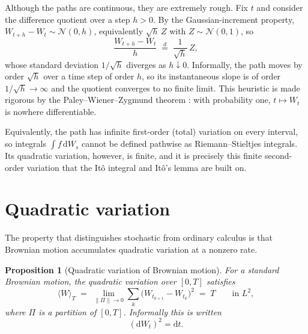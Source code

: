 \documentclass[11pt]{article}
\newcommand{\dd}{\mathrm{d}}           %
\newcommand{\dW}{\dd W_t}              %
\newcommand{\dt}{\dd t}                %
\theoremstyle{plain}
\newtheorem{proposition}{Proposition}
\theoremstyle{definition}
\theoremstyle{remark}
\begin{document}
Although the paths are continuous, they are extremely rough. Fix $t$ and
consider the difference quotient over a step $h>0$. By the Gaussian-increment
property, $W_{t+h}-W_t \sim \mathcal{N}(0,h)$, equivalently $\sqrt{h}\,Z$ with
$Z\sim\mathcal{N}(0,1)$, so
\[
   \frac{W_{t+h}-W_t}{h} \;\overset{d}{=}\; \frac{1}{\sqrt{h}}\,Z,
\]
whose standard deviation $1/\sqrt{h}$ diverges as $h\downarrow 0$. Informally,
the path moves by order $\sqrt{h}$ over a time step of order $h$, so its
instantaneous slope is of order $1/\sqrt{h}\to\infty$ and the quotient
converges to no finite limit. This heuristic is made rigorous by the
Paley--Wiener--Zygmund theorem \cite{pwz1933}: with probability one,
$t\mapsto W_t$ is nowhere differentiable.

Equivalently, the path has infinite first-order (total) variation on every
interval, so integrals $\int f\,\dd W_s$ cannot be defined pathwise as
Riemann--Stieltjes integrals. Its quadratic variation, however, is
finite, and it is precisely this finite second-order variation that the It\^o integral and It\^o's lemma are built on.

\section{Quadratic variation}\label{sec:qv}

The property that distinguishes stochastic from ordinary calculus is
that Brownian motion accumulates quadratic variation at a
nonzero rate.

\begin{proposition}[Quadratic variation of Brownian motion]\label{prop:qv}
For a standard Brownian motion, the quadratic variation over $[0,T]$
satisfies
\[
   \langle W\rangle_T \;=\; \lim_{\|\Pi\|\to 0}\sum_{k} \big(W_{t_{k+1}}-W_{t_k}\big)^2
        \;=\; T
   \qquad \text{in } L^2,
\]
where $\Pi$ is a partition of $[0,T]$. Informally this is written
\[
   (\dW)^2 = \dt.
\]
\end{proposition}
\end{document}
